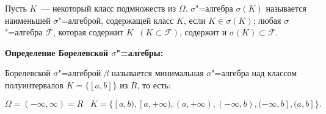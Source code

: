     Пусть $K$~--- некоторый класс подмножеств из $\Omega$. $\sigma$"=алгебра
    $\sigma(K)$ называется наименьшей $\sigma$"=алгеброй, содержащей
    класс $K$, если $K \in \sigma(K)$; любая $\sigma$"=алгебра $\mathcal{F}$,
    которая содержит $K \;\; (K \subset \mathcal{F})$, содержит и 
    $\sigma(K) \subset \mathcal{F}$.
    \bigskip

\textbf{Определение Борелевской $\sigma$"=алгебры:}
    \smallskip
    
    Борелевской $\sigma$"=алгеброй $\beta$ называется минимальная $\sigma$"=алгебра
    над классом полуинтервалов $K = \{[a, b]\}$ из $R$, то есть:

    \[
        \Omega = (-\infty, \infty) = R \;\;\; K = \{[a, b), [a, +\infty),
        (a, +\infty), (-\infty, b), (-\infty, b], (a, b]\}.  
    \]

